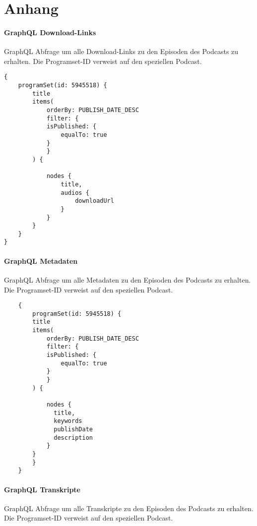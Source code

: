 \chapter{Anhang}\label{app:supplemental-information}


\label{graphql-1}
\subsubsection*{GraphQL Download-Links}
GraphQL Abfrage um alle Download-Links zu den Episoden des Podcasts  zu erhalten.
Die Programset-ID verweist auf den speziellen Podcast.

\begin{verbatim}
{
    programSet(id: 5945518) {
        title
        items(
            orderBy: PUBLISH_DATE_DESC
            filter: {
            isPublished: {
                equalTo: true
            }
            }
        ) {
            
            nodes {
                title,
                audios {
                    downloadUrl
                }
            }
        }
    }
}

\end{verbatim}

\label{ch:graphql-2}
\subsubsection*{GraphQL Metadaten}
GraphQL Abfrage um alle Metadaten zu den Episoden des Podcasts  zu erhalten.
Die Programset-ID verweist auf den speziellen Podcast.

\begin{verbatim}
    {
        programSet(id: 5945518) {
        title
        items(
            orderBy: PUBLISH_DATE_DESC
            filter: {
            isPublished: {
                equalTo: true
            }
            }
        ) {
          	
            nodes {
              title,
              keywords
              publishDate
              description
            }
        }
        }
    }

\end{verbatim}

\label{ch:graphql-3}
\subsubsection*{GraphQL Transkripte}

GraphQL Abfrage um alle Transkripte zu den Episoden des Podcasts   zu erhalten.
Die Programset-ID verweist auf den speziellen Podcast.

